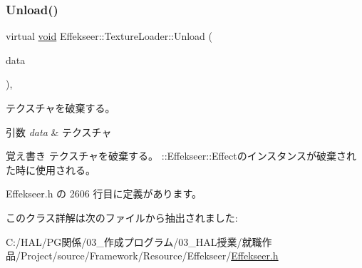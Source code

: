 \subsubsection{\texorpdfstring{Unload()}{Unload()}}
{\footnotesize\ttfamily virtual \mbox{\hyperlink{namespace_effekseer_ab34c4088e512200cf4c2716f168deb56}{void}} Effekseer\+::\+Texture\+Loader\+::\+Unload (\begin{DoxyParamCaption}\item[{\mbox{\hyperlink{struct_effekseer_1_1_texture_data}{Texture\+Data}} $\ast$}]{data }\end{DoxyParamCaption})\hspace{0.3cm}{\ttfamily [inline]}, {\ttfamily [virtual]}}



テクスチャを破棄する。 


\begin{DoxyParams}{引数}
{\em data} & テクスチャ \\
\hline
\end{DoxyParams}
\begin{DoxyNote}{覚え書き}
テクスチャを破棄する。 \+::\+Effekseer\+::\+Effectのインスタンスが破棄された時に使用される。 
\end{DoxyNote}


 Effekseer.\+h の 2606 行目に定義があります。



このクラス詳解は次のファイルから抽出されました\+:\begin{DoxyCompactItemize}
\item 
C\+:/\+H\+A\+L/\+P\+G関係/03\+\_\+作成プログラム/03\+\_\+\+H\+A\+L授業/就職作品/\+Project/source/\+Framework/\+Resource/\+Effekseer/\mbox{\hyperlink{_effekseer_8h}{Effekseer.\+h}}\end{DoxyCompactItemize}
